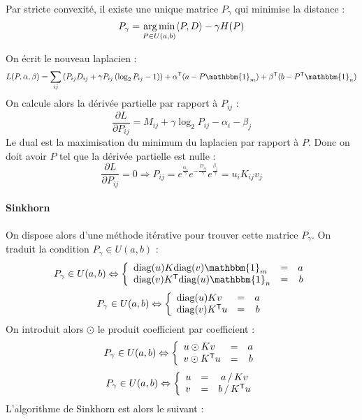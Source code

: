 Par stricte convexité, il existe une unique matrice $P_\gamma$ qui minimise la distance :
$$ P_\gamma = \operatorname*{arg\,min}_{P \in U(a, b)} \langle P, D \rangle - \gamma H(P) $$


\dem
On écrit le nouveau laplacien :
$$ L(P, \alpha, \beta) = \sum_{ij} \left( P_{ij} D_{ij} + \gamma P_{ij} \left( \log_2 P_{ij} - 1 \right) \right) + \alpha^\trans (a - P \mathbbm{1}_m) + \beta^\trans (b - P^\trans \mathbbm{1}_n) $$
On calcule alors la dérivée partielle par rapport à $P_{ij}$ :
$$ \dfrac{\partial L}{\partial P_{ij}} = M_{ij} + \gamma \log_2 P_{ij} - \alpha_i - \beta_j $$
Le dual est la maximisation du minimum du laplacien par rapport à $P$. Donc on doit avoir $P$ tel que la dérivée partielle est nulle :
$$ \dfrac{\partial L}{\partial P_{ij}} = 0 \Rightarrow P_{ij} = e^{\frac{\alpha_i}{\gamma}} e^{-\frac{D_{ij}}{\gamma}}  e^{\frac{\beta_j}{\gamma}} = u_i K_{ij} v_j $$
\findem

\paragraph{Sinkhorn}
On dispose alors d'une méthode itérative pour trouver cette matrice $P_\gamma$. On traduit la condition $P_\gamma \in U(a, b)$ :
$$ P_\gamma \in U(a, b) \Leftrightarrow \left\{ \begin{array}{lrr}
\text{diag}(u) K \text{diag}(v) \mathbbm{1}_m & = & a \\
\text{diag}(v) K^\trans \text{diag}(u) \mathbbm{1}_n & = & b
\end{array} \right. $$
$$ P_\gamma \in U(a, b) \Leftrightarrow \left\{ \begin{array}{lrr}
\text{diag}(u) K v & = & a \\
\text{diag}(v) K^{\mathsf{T}} u & = & b
\end{array} \right. $$
On introduit alors $\odot$ le produit coefficient par coefficient :
$$ P_\gamma \in U(a, b) \Leftrightarrow \left\{ \begin{array}{lrr}
u \odot K v & = & a \\
v \odot K^{\mathsf{T}} u & = & b
\end{array} \right. $$
$$ P_\gamma \in U(a, b) \Leftrightarrow \left\{ \begin{array}{lrc}
u & = & a \, / \, K v \\
v & = & b \, / \, K^{\mathsf{T}} u
\end{array} \right. $$
L'algorithme de Sinkhorn est alors le suivant :\\
\begin{algorithm}[H]
\end{algorithm}

